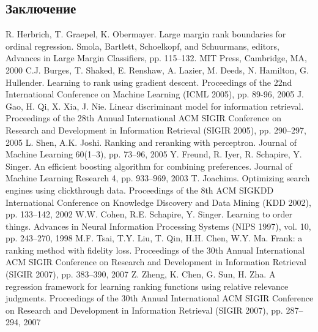 \documentclass[12pt,a4paper,oneside]{article}
\begin{document}
\begin{multicols}{2}

\vspace*{1em}
\chapter{Заключение}

\par


\begin{thebibliography}{9}
	 R. Herbrich, T. Graepel, K. Obermayer. Large margin rank boundaries for ordinal regression. Smola, Bartlett, Schoelkopf, and Schuurmans, editors, Advances in Large Margin Classifiers, pp. 115–132. MIT Press, Cambridge, MA, 2000%
	 C.J. Burges, T. Shaked, E. Renshaw, A. Lazier, M. Deeds, N. Hamilton, G. Hullender. Learning to rank using gradient descent. Proceedings of the 22nd International Conference on Machine Learning (ICML 2005), pp. 89-96, 2005%
	 J. Gao, H. Qi, X. Xia, J. Nie. Linear discriminant model for information retrieval. Proceedings of the 28th Annual International ACM SIGIR Conference on Research and Development in Information Retrieval (SIGIR 2005), pp. 290–297, 2005%
	 L. Shen, A.K. Joshi. Ranking and reranking with perceptron. Journal of Machine Learning 60(1–3), pp. 73–96, 2005%
	 Y. Freund, R. Iyer, R. Schapire, Y. Singer. An efficient boosting algorithm for combining preferences. Journal of Machine Learning Research 4, pp. 933–969, 2003%
	 T. Joachims. Optimizing search engines using clickthrough data. Proceedings of the 8th ACM SIGKDD International Conference on Knowledge Discovery and Data Mining (KDD 2002), pp. 133–142, 2002%
	 W.W. Cohen, R.E. Schapire, Y. Singer. Learning to order things. Advances in Neural Information Processing Systems (NIPS 1997), vol. 10, pp. 243–270, 1998%
	 M.F. Tsai, T.Y. Liu, T. Qin, H.H. Chen, W.Y. Ma. Frank: a ranking method with fidelity loss. Proceedings of the 30th Annual International ACM SIGIR Conference on Research and Development in Information Retrieval (SIGIR 2007), pp. 383–390, 2007%
	 Z. Zheng, K. Chen, G. Sun, H. Zha. A regression framework for learning ranking functions using relative relevance judgments. Proceedings of the 30th Annual International ACM SIGIR Conference on Research and Development in Information Retrieval (SIGIR 2007), pp. 287–294, 2007%

\end{thebibliography}
\end{multicols}
\end{document}
